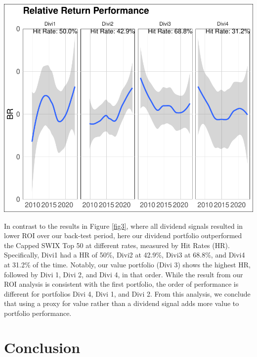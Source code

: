 \documentclass[11pt,preprint, authoryear]{elsarticle}
\let\origfigure\figure
\let\endorigfigure\endfigure
\renewenvironment{figure}[1][2] {
    \expandafter\origfigure\expandafter[H]
} {
    \endorigfigure
}
\numberwithin{equation}{section}
\numberwithin{figure}{section}
\numberwithin{table}{section}
\begin{document}
\begin{figure}[H]

\includegraphics{Much_Ado_About_Dividends_files/figure-latex/unnamed-chunk-5-1} \hfill{}

\caption{Rolling 3 Year Returns \label{fig4}}\label{fig:unnamed-chunk-5}
\end{figure}

In contrast to the results in Figure \ref{fig3}, where all dividend
signals resulted in lower ROI over our back-test period, here our
dividend portfolio outperformed the Capped SWIX Top 50 at different
rates, measured by Hit Rates (HR). Specifically, Divi1 had a HR of 50\%,
Divi2 at 42.9\%, Divi3 at 68.8\%, and Divi4 at 31.2\% of the time.
Notably, our value portfolio (Divi 3) shows the highest HR, followed by
Divi 1, Divi 2, and Divi 4, in that order. While the result from our ROI
analysis is consistent with the first portfolio, the order of
performance is different for portfolios Divi 4, Divi 1, and Divi 2. From
this analysis, we conclude that using a proxy for value rather than a
dividend signal adds more value to portfolio performance.

\newpage

\hypertarget{conclusion}{%
\section*{Conclusion}\label{conclusion}}
\end{document}
